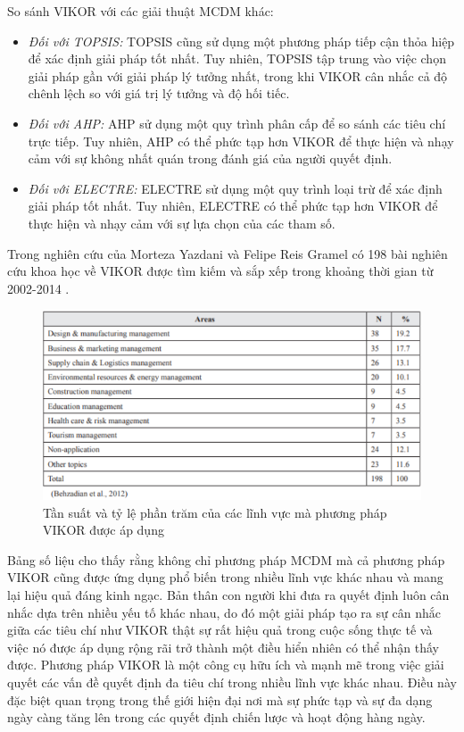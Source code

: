 So sánh VIKOR với các giải thuật MCDM khác: 
\begin{itemize}
    \item \textit{Đối với TOPSIS:} TOPSIS cũng sử dụng một phương pháp tiếp cận thỏa hiệp để xác định giải pháp tốt nhất. Tuy nhiên, TOPSIS tập trung vào việc chọn giải pháp gần với giải pháp lý tưởng nhất, trong khi VIKOR cân nhắc cả độ chênh lệch so với giá trị lý tưởng và độ hối tiếc.
    \item \textit{Đối với AHP:} AHP sử dụng một quy trình phân cấp để so sánh các tiêu chí trực tiếp. Tuy nhiên, AHP có thể phức tạp hơn VIKOR để thực hiện và nhạy cảm với sự không nhất quán trong đánh giá của người quyết định.
    \item \textit{Đối với ELECTRE:} ELECTRE sử dụng một quy trình loại trừ để xác định giải pháp tốt nhất. Tuy nhiên, ELECTRE có thể phức tạp hơn VIKOR để thực hiện và nhạy cảm với sự lựa chọn của các tham số.
\end{itemize}

Trong nghiên cứu của Morteza Yazdani và Felipe Reis Gramel có 198 bài nghiên cứu khoa học về VIKOR được tìm kiếm và sắp xếp trong khoảng thời gian từ 2002-2014 \cite{morteza}. 

\begin{figure}[H]
    \centering
    \includegraphics[width=0.8\linewidth]{images/VIKORtable.png}
    \vspace{0.5cm}
    \caption{Tần suất và tỷ lệ phần trăm của các lĩnh vực mà phương pháp VIKOR được áp dụng}
\end{figure}

Bảng số liệu cho thấy rằng không chỉ phương pháp MCDM mà cả phương pháp VIKOR cũng được ứng dụng phổ biến trong nhiều lĩnh vực khác nhau và mang lại hiệu quả đáng kinh ngạc. Bản thân con người khi đưa ra quyết định luôn cân nhắc dựa trên nhiều yếu tố khác nhau, do đó một giải pháp tạo ra sự cân nhắc giữa các tiêu chí như VIKOR thật sự rất hiệu quả trong cuộc sống thực tế và việc nó được áp dụng rộng rãi trở thành một điều hiển nhiên có thể nhận thấy được. Phương pháp VIKOR là một công cụ hữu ích và mạnh mẽ trong việc giải quyết các vấn đề quyết định đa tiêu chí trong nhiều lĩnh vực khác nhau. Điều này đặc biệt quan trọng trong thế giới hiện đại nơi mà sự phức tạp và sự đa dạng ngày càng tăng lên trong các quyết định chiến lược và hoạt động hàng ngày.

